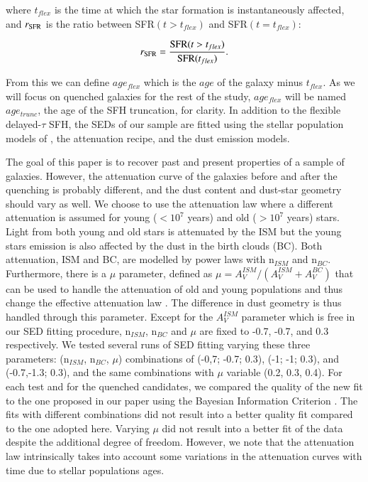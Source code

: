 \documentclass[traditabstract]{aa} %
\begin{document}
\noindent where $t_{flex}$ is the time at which the star formation is instantaneously affected, and $r_{\rm{SFR}}$ is the ratio between SFR$(t>t_{flex})$ and SFR$(t=t_{flex})$:
        
\begin{equation}
   r_{\rm{SFR}} = \frac{\mathrm{SFR}(t>t_{flex})}{\mathrm{SFR}(t_{flex})}.
\end{equation}

From this we can define $age_{flex}$ which is the $age$ of the galaxy minus $t_{flex}$.
As we will focus on quenched galaxies for the rest of the study, $age_{flex}$ will be named $age_{trunc}$, the age of the SFH truncation, for clarity.
In addition to the flexible delayed-$\tau$ SFH, the SEDs of our sample are fitted using the stellar population models of \cite{BruzualCharlot03}, the \cite{CharlotFall00} attenuation recipe, and the \cite{Dale14} dust emission models.

The goal of this paper is to recover past and present properties of a sample of galaxies.
However, the attenuation curve of the galaxies before and after the quenching is probably different, and the dust content and dust-star geometry should vary as well.
We choose to use the \cite{CharlotFall00} attenuation law where a different attenuation is assumed for young ($<10^7$ years) and old ($>10^7$ years) stars. Light from both young and old stars is attenuated by the ISM but the young stars emission is also affected by the dust in the birth clouds (BC). 
Both attenuation, ISM and BC, are modelled by power laws with n$_{ISM}$ and n$_{BC}$. 
Furthermore, there is a $\mu$ parameter, defined as $\mu = A_V^{ISM}/(A_V^{ISM}+A_V^{BC})$ that can be used to handle the attenuation of old and young populations and thus change the effective attenuation law \citep[e.g.][]{Battisti20}. 
The difference in dust geometry is thus handled through this parameter. 
Except for the $A_V^{ISM}$ parameter which is free in our SED fitting procedure, n$_{ISM}$, n$_{BC}$ and $\mu$ are fixed to -0.7, -0.7, and 0.3 respectively. 
We tested several runs of SED fitting varying these three parameters: (n$_{ISM}$, n$_{BC}$, $\mu$) combinations of (-0,7; -0.7; 0.3), (-1; -1; 0.3), and (-0.7,-1.3; 0.3), and the same combinations with $\mu$ variable (0.2, 0.3, 0.4). 
For each test and for the quenched candidates, we compared the quality of the new fit to the one proposed in our paper using the Bayesian Information Criterion \citep[see for instance][]{Ciesla18,Aufort20}. 
The fits with different combinations did not result into a better quality fit compared to the one adopted here. 
Varying $\mu$ did not result into a better fit of the data despite the additional degree of freedom. 
However, we note that the \cite{CharlotFall00} attenuation law intrinsically takes into account some variations in the attenuation curves with time due to stellar populations ages.
\end{document}
